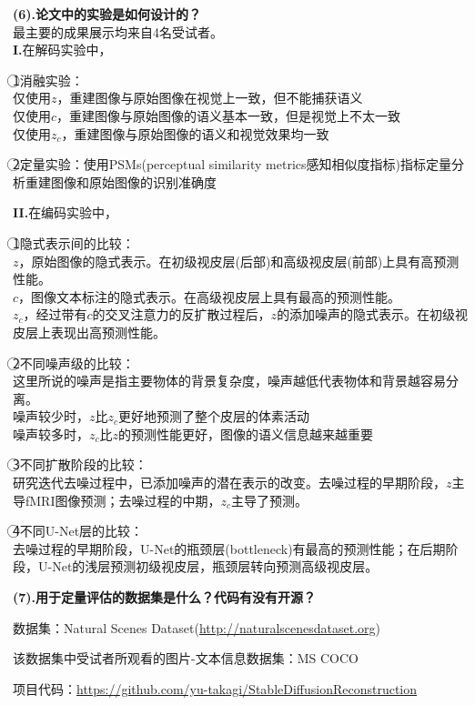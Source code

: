 \documentclass[12pt, a4paper, oneside]{ctexart}
\begin{document}
    \noindent\textbf{(6).论文中的实验是如何设计的？}\\
    最主要的成果展示均来自4名受试者。\\
    \textbf{I.}在解码实验中，

    \textcircled{1}消融实验：\\
    仅使用$z$，重建图像与原始图像在视觉上一致，但不能捕获语义\\
    仅使用$c$，重建图像与原始图像的语义基本一致，但是视觉上不太一致\\
    仅使用$z_c$，重建图像与原始图像的语义和视觉效果均一致

    \textcircled{2}定量实验：使用PSMs(perceptual similarity metrics感知相似度指标)指标定量分析重建图像和原始图像的识别准确度

    \textbf{II.}在编码实验中，

    \textcircled{1}隐式表示间的比较：\\
    $z$，原始图像的隐式表示。在初级视皮层(后部)和高级视皮层(前部)上具有高预测性能。\\
    $c$，图像文本标注的隐式表示。在高级视皮层上具有最高的预测性能。\\
    $z_c$，经过带有$c$的交叉注意力的反扩散过程后，$z$的添加噪声的隐式表示。在初级视皮层上表现出高预测性能。

    \textcircled{2}不同噪声级的比较：\\
    这里所说的噪声是指主要物体的背景复杂度，噪声越低代表物体和背景越容易分离。\\
    噪声较少时，$z$比$z_c$更好地预测了整个皮层的体素活动\\
    噪声较多时，$z_c$比$z$的预测性能更好，图像的语义信息越来越重要

    \textcircled{3}不同扩散阶段的比较：\\
    研究迭代去噪过程中，已添加噪声的潜在表示的改变。去噪过程的早期阶段，$z$主导fMRI图像预测；去噪过程的中期，$z_c$主导了预测。

    \textcircled{4}不同U-Net层的比较：\\
    去噪过程的早期阶段，U-Net的瓶颈层(bottleneck)有最高的预测性能；在后期阶段，U-Net的浅层预测初级视皮层，瓶颈层转向预测高级视皮层。

    \noindent\textbf{(7).用于定量评估的数据集是什么？代码有没有开源？}

    数据集：Natural Scenes Dataset\cite{Allen2022}(\url{http://naturalscenesdataset.org})

    该数据集中受试者所观看的图片-文本信息数据集：MS COCO

    项目代码：\url{https://github.com/yu-takagi/StableDiffusionReconstruction}
\end{document}
